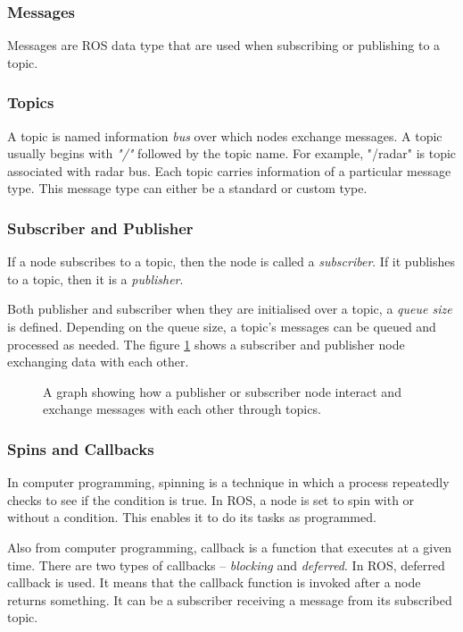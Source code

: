 \subsubsection*{Messages}
Messages are ROS data type that are used when subscribing or publishing to a topic.
\subsubsection*{Topics}
A topic is named information \textit{bus} over which nodes exchange messages.
A topic usually begins with \textit{"/"} followed by the topic name. For example, "/radar"
is topic associated with radar bus. Each topic carries information of a particular message
type. This message type can either be a standard or custom type.
\subsubsection*{Subscriber and Publisher}
If a node subscribes to a topic, then the node is called a \textit{subscriber}. If it
publishes to a topic, then it is a \textit{publisher}.

Both publisher and subscriber when they are initialised over a topic, a \textit{queue
size} is defined. Depending on the queue size, a topic's messages can be queued and
processed as needed. The figure \ref{fig:rosgraph} shows a subscriber and publisher node
exchanging data with each other.

\begin{figure}[!ht]
    \centering
    \def\svgwidth{0.7\textwidth}
    
    \caption{A graph showing how a publisher or subscriber node interact and exchange
    messages with each other through topics.}
    \label{fig:rosgraph}
\end{figure}

\subsubsection*{Spins and Callbacks}
In computer programming, spinning is a technique in which a process repeatedly checks to
see if the condition is true. In ROS, a node is set to spin with or without a condition. This
enables it to do its tasks as programmed.

Also from computer programming, callback is a function that executes at a given time.
There are two types of callbacks -- \textit{blocking} and \textit{deferred}. In ROS,
deferred callback is used. It means that the callback function is invoked after a node
returns something. It can be a subscriber receiving a message from its subscribed topic.

